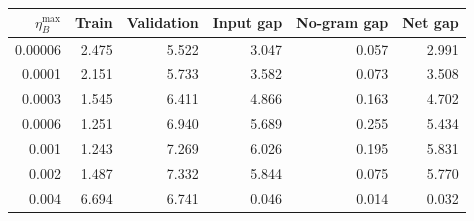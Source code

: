 \begin{tabular}{rrrrrr}
\toprule
$\eta_B^{\max}$ & Train & Validation & Input gap & No-gram gap & Net gap \\
\midrule
0.00006 & 2.475 & 5.522 & 3.047 & 0.057 & 2.991 \\
0.0001 & 2.151 & 5.733 & 3.582 & 0.073 & 3.508 \\
0.0003 & 1.545 & 6.411 & 4.866 & 0.163 & 4.702 \\
0.0006 & 1.251 & 6.940 & 5.689 & 0.255 & 5.434 \\
0.001 & 1.243 & 7.269 & 6.026 & 0.195 & 5.831 \\
0.002 & 1.487 & 7.332 & 5.844 & 0.075 & 5.770 \\
0.004 & 6.694 & 6.741 & 0.046 & 0.014 & 0.032 \\
\bottomrule
\end{tabular}
